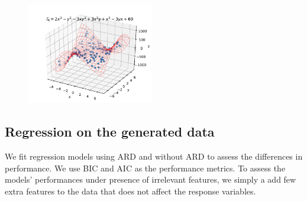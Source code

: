 \documentclass[12pt]{article}
\begin{document}
\begin{figure}[H]
            \includegraphics[width=0.49\textwidth]{f_6.pdf}
            \caption{}
        \end{figure}
    
    \subsection{Regression on the generated data}
        We fit regression models using ARD and without ARD to assess the differences in performance. We use BIC and AIC as the performance metrics. To assess the models' performances under presence of irrelevant features, we simply a add few extra features to the data that does not affect the response variables. 
\end{document}
